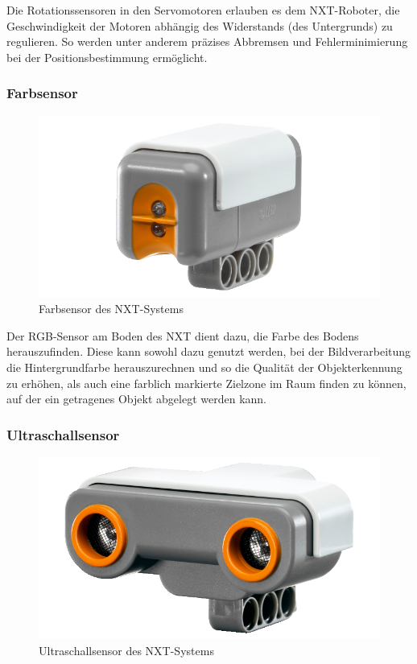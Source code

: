 Die Rotationssensoren in den Servomotoren erlauben es dem NXT-Roboter, die Geschwindigkeit der Motoren abhängig des Widerstands (des Untergrunds) zu regulieren. So werden unter anderem präzises Abbremsen und Fehlerminimierung bei der Positionsbestimmung ermöglicht.

\subsubsection{Farbsensor}

\begin{figure}[h]
\centering
\includegraphics[width=\textwidth/3]{Bilder/Robot/color_sensor}
\caption{Farbsensor des NXT-Systems}
\label{fig:colorSensor}
\end{figure}

Der RGB-Sensor am Boden des NXT dient dazu, die Farbe des Bodens herauszufinden. Diese kann sowohl dazu genutzt werden, bei der Bildverarbeitung die Hintergrundfarbe herauszurechnen und so die Qualität der Objekterkennung zu erhöhen, als auch eine farblich markierte Zielzone im Raum finden zu können, auf der ein getragenes Objekt abgelegt werden kann.

\subsubsection{Ultraschallsensor}
\label{subsec:Ultraschall}

\begin{figure}[h]
\centering
\includegraphics[width=\textwidth/3]{Bilder/Robot/distance_sensor}
\caption{Ultraschallsensor des NXT-Systems}
\label{fig:distanceSensor}
\end{figure}

